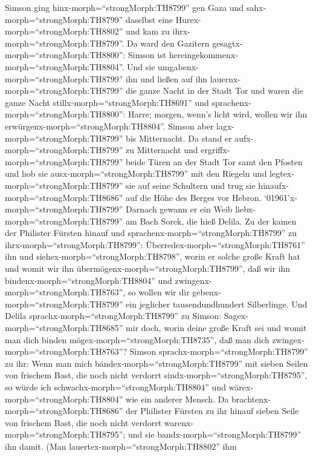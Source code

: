  Simson ging hinx-morph=``strongMorph:TH8799'' gen Gaza und
sahx-morph=``strongMorph:TH8799'' daselbst eine
Hurex-morph=``strongMorph:TH8802'' und kam zu
ihrx-morph=``strongMorph:TH8799''.  Da ward den Gazitern
gesagtx-morph=``strongMorph:TH8800'': Simson ist
hereingekommenx-morph=``strongMorph:TH8804''. Und sie
umgabenx-morph=``strongMorph:TH8799'' ihn und ließen auf ihn
lauernx-morph=``strongMorph:TH8799'' die ganze Nacht in der Stadt Tor
und waren die ganze Nacht stillx-morph=``strongMorph:TH8691'' und
sprachenx-morph=``strongMorph:TH8800'': Harre; morgen, wenn's licht
wird, wollen wir ihn erwürgenx-morph=``strongMorph:TH8804''.
 Simson aber lagx-morph=``strongMorph:TH8799'' bis
Mitternacht. Da stand er aufx-morph=``strongMorph:TH8799'' zu
Mitternacht und ergriffx-morph=``strongMorph:TH8799'' beide Türen an der
Stadt Tor samt den Pfosten und hob sie ausx-morph=``strongMorph:TH8799''
mit den Riegeln und legtex-morph=``strongMorph:TH8799'' sie auf seine
Schultern und trug sie hinaufx-morph=``strongMorph:TH8686'' auf die Höhe
des Berges vor Hebron. 
`01961'\textbar x-morph=``strongMorph:TH8799'' Darnach gewann er ein
Weib liebx-morph=``strongMorph:TH8799'' am Bach Sorek, die hieß Delila.
 Zu der kamen der Philister Fürsten hinauf und
sprachenx-morph=``strongMorph:TH8799'' zu
ihrx-morph=``strongMorph:TH8799'':
Überredex-morph=``strongMorph:TH8761'' ihn und
siehex-morph=``strongMorph:TH8798'', worin er solche große Kraft hat und
womit wir ihn übermögenx-morph=``strongMorph:TH8799'', daß wir ihn
bindenx-morph=``strongMorph:TH8804'' und
zwingenx-morph=``strongMorph:TH8763'', so wollen wir dir
gebenx-morph=``strongMorph:TH8799'' ein jeglicher tausendundhundert
Silberlinge.  Und Delila
sprachx-morph=``strongMorph:TH8799'' zu Simson:
Sagex-morph=``strongMorph:TH8685'' mir doch, worin deine große Kraft sei
und womit man dich binden mögex-morph=``strongMorph:TH8735'', daß man
dich zwingex-morph=``strongMorph:TH8763''?  Simson
sprachx-morph=``strongMorph:TH8799'' zu ihr: Wenn man mich
bändex-morph=``strongMorph:TH8799'' mit sieben Seilen von frischem Bast,
die noch nicht verdorrt sindx-morph=``strongMorph:TH8795'', so würde ich
schwachx-morph=``strongMorph:TH8804'' und
wärex-morph=``strongMorph:TH8804'' wie ein anderer Mensch. 
Da brachtenx-morph=``strongMorph:TH8686'' der Philister Fürsten zu ihr
hinauf sieben Seile von frischem Bast, die noch nicht verdorrt
warenx-morph=``strongMorph:TH8795''; und sie
bandx-morph=``strongMorph:TH8799'' ihn damit.  (Man
lauertex-morph=``strongMorph:TH8802'' ihm
